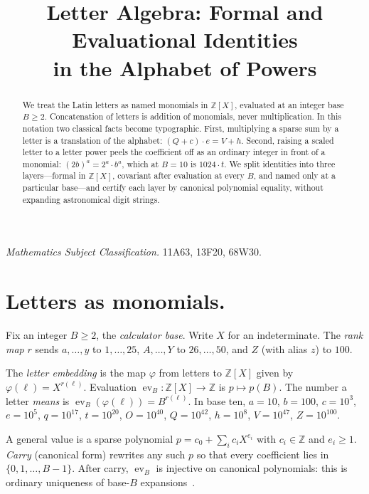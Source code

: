 \documentclass{article}
\title{Letter Algebra: Formal and Evaluational Identities\\
in the Alphabet of Powers}
\DeclareMathOperator{\ev}{ev}
\newcommand{\ZZ}{\mathbb{Z}}
\newcommand{\rank}{r}
\theoremstyle{plain}
\theoremstyle{definition}
\theoremstyle{remark}
\begin{document}
\maketitle

\begin{abstract}
We treat the Latin letters as named monomials in \(\ZZ[X]\), evaluated at
an integer base \(B \ge 2\). Concatenation of letters is addition of
monomials, never multiplication. In this notation two classical facts become
typographic. First, multiplying a sparse sum by a letter is a translation of
the alphabet: \((Q+c)\cdot e = V+h\). Second, raising a scaled letter to a
letter power peels the coefficient off as an ordinary integer in front of a
monomial: \((2b)^a = 2^a\cdot b^a\), which at \(B=10\) is \(1024\cdot t\).
We split identities into three layers---formal in \(\ZZ[X]\), covariant
after evaluation at every \(B\), and named only at a particular
base---and certify each layer by canonical polynomial equality, without
expanding astronomical digit strings.
\end{abstract}

\noindent
\textit{Mathematics Subject Classification.}
11A63, 13F20, 68W30.

\section{Letters as monomials.}
\label{sec:letters}

Fix an integer \(B \ge 2\), the \emph{calculator base}. Write \(X\) for an
indeterminate. The \emph{rank map} \(\rank\) sends
\(a,\dots,y\) to \(1,\dots,25\),
\(A,\dots,Y\) to \(26,\dots,50\), and
\(Z\) (with alias \(z\)) to \(100\).

The \emph{letter embedding} is the map \(\varphi\) from letters to \(\ZZ[X]\)
given by \(\varphi(\ell) = X^{\rank(\ell)}\). Evaluation
\(\ev_B \colon \ZZ[X] \to \ZZ\) is \(p \mapsto p(B)\). The number a letter
\emph{means} is \(\ev_B(\varphi(\ell)) = B^{\rank(\ell)}\). In base ten,
\(a=10\), \(b=100\), \(c=10^3\), \(e=10^5\), \(q=10^{17}\), \(t=10^{20}\),
\(O=10^{40}\), \(Q=10^{42}\), \(h=10^8\), \(V=10^{47}\), \(Z=10^{100}\).

A general value is a sparse polynomial
\(p = c_0 + \sum_i c_i X^{e_i}\) with \(c_i \in \ZZ\) and \(e_i \ge 1\).
\emph{Carry} (canonical form) rewrites any such \(p\) so that every
coefficient lies in \(\{0,1,\dots,B-1\}\). After carry, \(\ev_B\) is
injective on canonical polynomials: this is ordinary uniqueness of
base-\(B\) expansions~\cite{knuth97}.
\end{document}
